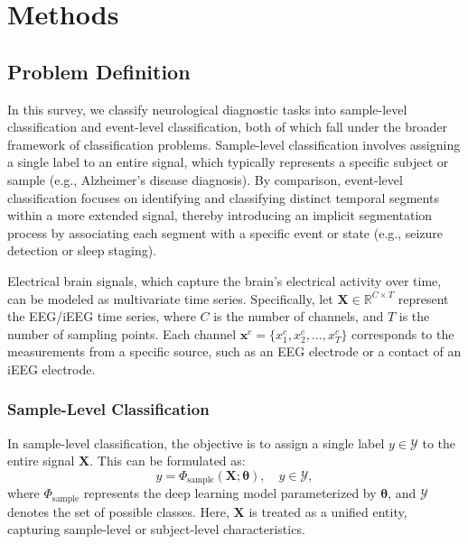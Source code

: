 \section{Methods}

\subsection{Problem Definition}
\label{sec:pdef}
In this survey, we classify neurological diagnostic tasks into sample-level classification and event-level classification, both of which fall under the broader framework of classification problems. 
Sample-level classification involves assigning a single label to an entire signal, which typically represents a specific subject or sample (e.g., Alzheimer’s disease diagnosis). 
By comparison, event-level classification focuses on identifying and classifying distinct temporal segments within a more extended signal, thereby introducing an implicit segmentation process by associating each segment with a specific event or state (e.g., seizure detection or sleep staging).

Electrical brain signals, which capture the brain's electrical activity over time, can be modeled as multivariate time series.
Specifically, let  $\mathbf{X} \in \mathbb{R}^{C \times T}$  represent the EEG/iEEG time series, where $C$ is the number of channels, and $T$ is the number of sampling points. Each channel  $\mathbf{x}^c = \{x^c_1, x^c_2, \dots, x^c_T\}$  corresponds to the measurements from a specific source, such as an EEG electrode or a contact of an iEEG electrode.

\subsubsection{Sample-Level Classification}
In sample-level classification, the objective is to assign a single label $y \in \mathcal{Y}$ to the entire signal $\mathbf{X}$. This can be formulated as:
\[
y = \Phi_{\text{sample}}(\mathbf{X}; \boldsymbol{\theta}), \quad y \in \mathcal{Y},
\]
where $\Phi_{\text{sample}}$ represents the deep learning model parameterized by $\boldsymbol{\theta}$, and $\mathcal{Y}$ denotes the set of possible classes. Here, $\mathbf{X}$ is treated as a unified entity, capturing sample-level or subject-level characteristics.


